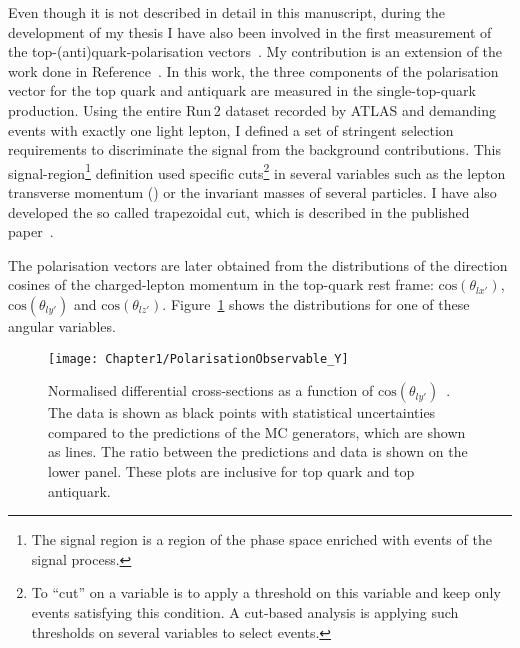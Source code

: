 Even though it is not described in detail in this manuscript, during the development 
of my thesis I have also been involved in the first measurement of the top-(anti)quark-polarisation 
vectors~\cite{ATLAS:2022vym}. 
My contribution is an extension of the work done in Reference~\cite{Martinez-Agullo:2017lty}.
In this work, the three components of the polarisation 
vector for the top quark and antiquark are measured in the single-top-quark \tchannel production. Using the 
entire Run$\,$2 dataset recorded by ATLAS and demanding events with exactly one light lepton,
I defined a set of stringent selection requirements to discriminate the \tchannel signal 
from the background contributions. This signal-region\footnote{The signal region is a 
region of the phase space enriched with events of the signal process.}
definition used specific cuts\footnote{To ``cut'' on a variable is to apply a threshold on this variable and
keep only events satisfying this condition. A cut-based analysis is
applying such thresholds on several variables to select events.}
 in several variables such as the lepton transverse momentum (\pT) or the invariant masses of several particles.
I have also developed the so called trapezoidal cut, which is described in the published 
paper~\cite{ATLAS:2022vym}.  

The polarisation vectors are later obtained from the distributions 
of the direction cosines of the charged-lepton momentum in the top-quark rest frame:
$\text{cos}(\theta_{lx'})$, $\text{cos}(\theta_{ly'})$ and $\text{cos}(\theta_{lz'})$. 
Figure~\ref{fig:Chap1:Polarisation:Observables} shows the distributions for one of these angular 
variables.

\begin{figure}[h]
\centering
	\texttt{[image: Chapter1/PolarisationObservable\_Y]}\hfill
	\caption{Normalised differential cross-sections as a function of $\text{cos}(\theta_{ly'})$~\cite{ATLAS:2022vym}. 
	The data is shown as black points with statistical uncertainties compared to the 
	predictions of the MC generators, which are shown as lines. The ratio between the
	predictions and data is shown on the lower panel. 
	These plots are inclusive for top quark and top antiquark.} 
	\label{fig:Chap1:Polarisation:Observables}
\end{figure} 

